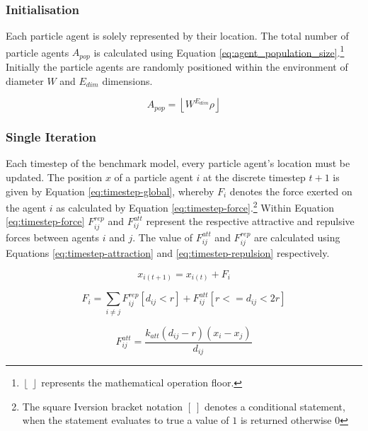     \subsubsection{Initialisation}
      Each particle agent is solely represented by their location. The total number of particle agents $A_{pop}$ is calculated using Equation \ref{eq:agent_population_size}.\footnote{$\left\lfloor\:\right\rfloor$ represents the mathematical operation floor.} Initially the particle agents are randomly positioned within the environment of diameter $W$ and $E_{dim}$ dimensions.      
      
      \begin{equation}\label{eq:agent_population_size}
        A_{pop} = \left\lfloor{W^{E_{dim}} \rho}\right\rfloor
      \end{equation}
    
    \subsubsection{Single Iteration}
      Each timestep of the benchmark model, every particle agent's location must be updated. The position $x$ of a particle agent $i$ at the discrete timestep $t+1$ is given by Equation \ref{eq:timestep-global}, whereby $F_{i}$ denotes the force exerted on the agent $i$ as calculated by Equation \ref{eq:timestep-force}.\footnote{The square Iversion bracket notation $[\:]$ denotes a conditional statement, when the statement evaluates to true a value of $1$ is returned otherwise $0$} Within Equation \ref{eq:timestep-force} $F_{ij}^{rep}$ and $F_{ij}^{att}$ represent the respective attractive and repulsive forces between agents $i$ and $j$. The value of $F_{ij}^{att}$ and $F_{ij}^{rep}$ are calculated using Equations \ref{eq:timestep-attraction} and \ref{eq:timestep-repulsion} respectively.
      
      \begin{equation}\label{eq:timestep-global}
        x_{i(t+1)} = x_{i(t)} + F_{i}
      \end{equation}
      
      \begin{equation}\label{eq:timestep-force}
        F_{i} = \sum\limits_{i \neq j} F_{ij}^{rep}[d_{ij} < r] + F_{ij}^{att}[r <= d_{ij} < 2r]
      \end{equation}
      
      \begin{equation}\label{eq:timestep-attraction}
        F_{ij}^{att} = \frac{k_{att}(d_{ij}-r)(x_{i} - x_{j})} {d_{ij}}
      \end{equation}  
      
